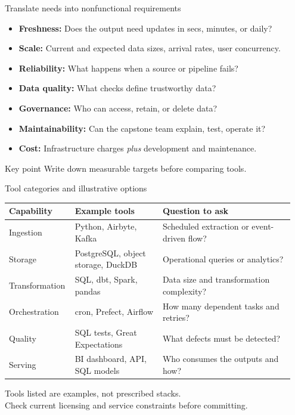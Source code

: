 \documentclass[aspectratio=43,10pt]{beamer}
\begin{document}
\begin{frame}{Translate needs into nonfunctional requirements}
\begin{itemize}
  \item \textbf{Freshness:} Does the output need updates in secs, minutes, or daily?
  \item \textbf{Scale:} Current and expected data sizes, arrival rates, user concurrency.
  \item \textbf{Reliability:} What happens when a source or pipeline fails?
  \item \textbf{Data quality:} What checks define trustworthy data?
  \item \textbf{Governance:} Who can access, retain, or delete data?
  \item \textbf{Maintainability:} Can the capstone team explain, test, operate it?
  \item \textbf{Cost:} Infrastructure charges \emph{plus} development and maintenance.
\end{itemize}
\begin{alertblock}{Key point}
Write down measurable targets before comparing tools.
\end{alertblock}
\end{frame}

\begin{frame}{Tool categories and illustrative options}
\small
\begin{tabular}{@{}p{0.2\linewidth}p{0.3\linewidth}p{0.45\linewidth}@{}}
\toprule
\textbf{Capability} & \textbf{Example tools} & \textbf{Question to ask} \\
\midrule
Ingestion & Python, Airbyte, Kafka & Scheduled extraction or event-driven flow? \\
Storage & PostgreSQL, object storage, DuckDB & Operational queries or analytics? \\
Transformation & SQL, dbt, Spark, pandas & Data size and transformation complexity? \\
Orchestration & cron, Prefect, Airflow & How many dependent tasks and retries? \\
Quality & SQL tests, Great Expectations & What defects must be detected? \\
Serving & BI dashboard, API, SQL models & Who consumes the outputs and how? \\
\bottomrule
\end{tabular}

\vspace{0.7em}
\small Tools listed are examples, not prescribed stacks.\\
Check current licensing and service constraints before committing.
\end{frame}
\end{document}
